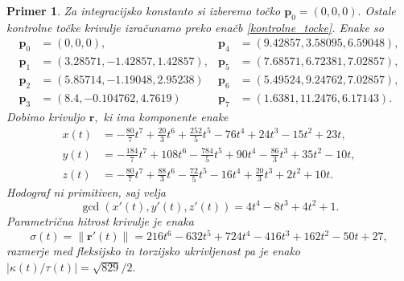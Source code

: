 \documentclass[12pt,a4paper,twoside]{article}
\theoremstyle{definition} %
\theoremstyle{plain} %
\theoremstyle{primerstyle}
\newtheorem{primer}[definicija]{Primer}
\numberwithin{equation}{section}  %
\newcommand{\pV}{\mathbf{p}}
\newcommand{\rV}{\mathbf{r}}
\begin{document}
\begin{primer}
	Za integracijsko konstanto si izberemo točko $\pV_0=(0,0,0).$ Ostale kontrolne točke krivulje izračunamo preko enačb \eqref{kontrolne_tocke}. Enake so
	\begin{align*}
		\pV_0&=(0,0,0),&\pV_4&=(9.42857, 3.58095, 6.59048),\\
		\pV_1&=(3.28571,-1.42857,1.42857),&\pV_5&=(7.68571, 6.72381, 7.02857),\\
		\pV_2&=(5.85714, -1.19048, 2.95238)&\pV_6&=(5.49524, 9.24762, 7.02857),\\
		\pV_3&=(8.4, -0.104762, 4.7619)&\pV_7&=(1.6381, 11.2476, 6.17143).
	\end{align*}
	Dobimo krivuljo $\rV,$ ki ima komponente enake
	\begin{align*}
		x(t)&=-\frac{80}{7}t^7+\frac{20}{3}t^6+\frac{252}{5}t^5-76t^4+24t^3-15t^2+23t,\\
		y(t)&=-\frac{184}{7}t^7+108t^6-\frac{784}{5}t^5+90t^4-\frac{86}{3}t^3+35t^2-10t,\\
		z(t)&=-\frac{80}{7}t^7+\frac{88}{3}t^6-\frac{72}{5}t^5-16t^4+\frac{20}{3}t^3+2t^2+10t.
	\end{align*}
	Hodograf ni primitiven, saj velja
	\begin{equation*}
		\gcd(x'(t),y'(t),z'(t))=4t^4-8t^3+4t^2+1.
	\end{equation*}
	Parametrična hitrost krivulje je enaka
	\begin{equation*}
		\sigma(t)=\lVert\rV'(t)\rVert=216t^6-632t^5+724t^4-416t^3+162t^2-50t+27,
	\end{equation*}
	razmerje med fleksijsko in torzijsko ukrivljenost pa je enako $|\kappa(t)/\tau(t)|=\sqrt{829}/2.$
\end{primer}
\end{document}
